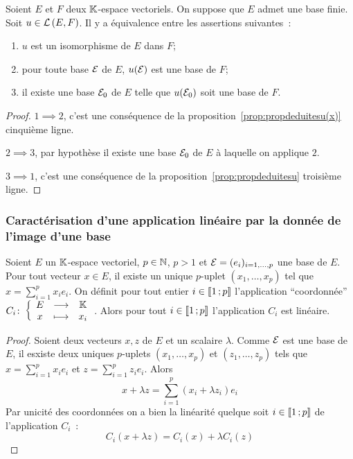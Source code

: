 \begin{theo}
Soient \(E\) et \(F\) deux \(\mathbb{K}\)-espace vectoriels. On suppose que \(E\) admet une base finie. Soit \(u \in \mathcal{L}\left(E,F\right)\). Il y a équivalence entre les assertions suivantes~:
\begin{enumerate}
\item \(u\) est un isomorphisme de \(E\) dans \(F\);
\item pour toute base \(\mathcal{E}\) de \(E\), \(u(\mathcal{E})\) est une base de \(F\);
\item il existe une base \(\mathcal{E}_0\) de \(E\) telle que \(u(\mathcal{E}_0)\) soit une base de \(F\).
\end{enumerate}
\end{theo}
\begin{proof}
  \(1 \implies 2\), c'est une conséquence de la proposition~\ref{prop:propdeduitesu(x)} cinquième ligne.

  \(2 \implies 3\), par hypothèse il existe une base \(\mathcal{E}_0\) de \(E\) à laquelle on applique \(2\).

  \(3 \implies 1\), c'est une conséquence de la proposition~\ref{prop:propdeduitesu} troisième ligne.
\end{proof}

\subsubsection{Caractérisation d'une application linéaire par la donnée de l'image d'une base}

\begin{lemme}
  Soient \(E\) un \(\mathbb{K}\)-espace vectoriel, \(p \in \mathbb{N}\), \(p>1\) et \(\mathcal{E}=(e_i)_{i=1, \ldots, p}\) une base de \(E\). Pour tout vecteur \(x \in E\), il existe un unique \(p\)-uplet \((x_1, \ldots, x_p)\) tel que \(x = \sum_{i=1}^p x_ie_i\). On définit pour tout entier \(i \in \mathopen{\llbracket}1\mathclose{}\mathpunct{};p\mathclose{\rrbracket}\) l'application ``coordonnée'' \(C_i\colon \left\{\begin{array}{ccc} E & \longrightarrow &\mathbb{K}\\ x & \longmapsto & x_i \end{array} \right.\). Alors pour tout \(i \in \mathopen{\llbracket}1\mathclose{}\mathpunct{};p\mathclose{\rrbracket}\) l'application \(C_i\) est linéaire.
\end{lemme}
\begin{proof}
  Soient deux vecteurs \(x,z\) de \(E\) et un scalaire \(\lambda\). Comme \(\mathcal{E}\) est une base de \(E\), il esxiste deux uniques \(p\)-uplets \((x_1, \ldots, x_p)\) et \((z_1, \ldots, z_p)\) tels que \(x = \sum_{i=1}^p x_ie_i\) et \(z = \sum_{i=1}^p z_ie_i\). Alors
  \begin{equation}
    x+\lambda z = \sum_{i=1}^p (x_i + \lambda z_i)e_i
  \end{equation}
  Par unicité des coordonnées on a bien la linéarité quelque soit \(i \in \mathopen{\llbracket}1\mathclose{}\mathpunct{};p\mathclose{\rrbracket}\) de l'application \(C_i\)~:
  \begin{equation}
    C_i(x+\lambda z)=C_i(x)+\lambda C_i(z)
  \end{equation}
\end{proof}

